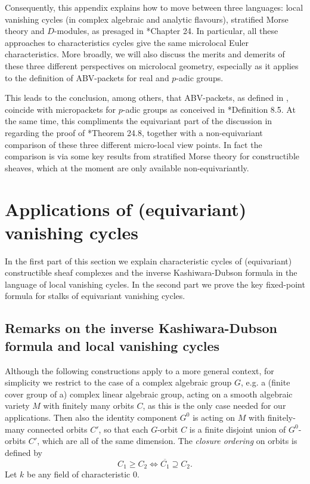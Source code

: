 \documentclass[11pt,letterpaper]{amsart}
\numberwithin{equation}{section}
\begin{document}
Consequently, this appendix explains how to move between three languages: local vanishing cycles (in complex algebraic and analytic flavours), stratified Morse theory and $D$-modules, as presaged in \cite{ABV92}*{Chapter 24}. 
In particular, all these approaches to characteristics cycles give the same microlocal Euler characteristics.
More broadly, we will also discuss the merits and demerits of these three different perspectives on microlocal geometry, especially as it applies to the definition of ABV-packets for real and $p$-adic groups.

This leads to the conclusion, among others, that ABV-packets, as defined in \cite{CFMMX22}, coincide with micropackets for $p$-adic groups as conceived in \cite{Vog93}*{Definition 8.5}. At the same time, this compliments the equivariant part of the discussion in \cite{ABV92} regarding the proof of \cite{ABV92}*{Theorem 24.8},
together with a non-equivariant comparison of these three different micro-local view points.
In fact the comparison is via some key results from stratified Morse theory for constructible sheaves, which at the moment are only  available
non-equivariantly.

\section{Applications of (equivariant) vanishing cycles}\label{section: equivariant vanishing cycles}

In the first part of this section we explain  characteristic cycles of (equivariant) constructible sheaf complexes and the inverse Kashiwara-Dubson formula
in the language of local vanishing cycles. In the second part we prove the key fixed-point formula for stalks of equivariant vanishing cycles.


\subsection{Remarks on the inverse Kashiwara-Dubson formula and local vanishing cycles}\label{subsection: KDF}

Although the following constructions apply to a more general context, for simplicity we restrict to the case of a complex algebraic group $G$, e.g. a (finite cover group of a) complex linear algebraic group, acting on a smooth algebraic variety $M$ with finitely many orbits $C$, as this is the only case needed for our applications. 
Then also the identity component $G^0$ is acting on $M$ with finitely-many connected orbits $C'$, so that each $G$-orbit $C$ is a finite disjoint union of $G^0$-orbits $C'$, which are all of the same dimension. The {\it closure ordering} on orbits is defined by
\[ 
C_1 \geq C_2 \Longleftrightarrow \overline{C_1} \supseteq C_2.
\]
Let $k$ be any field of characteristic $0$.
\end{document}
